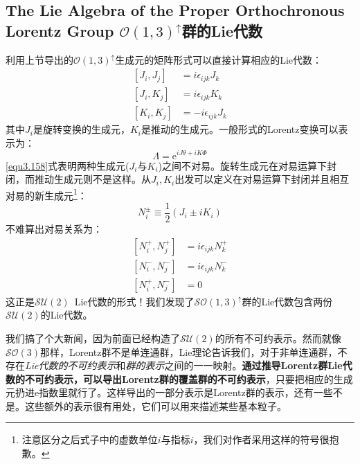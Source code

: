 \subsection[$\mathcal{O}(1, 3)^\uparrow$群的Lie代数]{The Lie Algebra of the Proper Orthochronous Lorentz Group \quad $\mathcal{O}(1, 3)^\uparrow$群的Lie代数}
\label{equ3.7.3}
利用上节导出的$\mathcal{O}(1, 3)^\uparrow$生成元的矩阵形式可以直接计算相应的Lie代数：
\begin{align}
\label{equ3.157}
	[J_i, J_j] &= i \epsilon_{ijk} J_k \\
\label{equ3.158}
	[J_i, K_j] &= i \epsilon_{ijk} K_k \\
\label{equ3.159}
	[K_i, K_j] &= -i \epsilon_{ijk} J_k
\end{align}
其中$J_i$是旋转变换的生成元，$K_i$是推动的生成元。一般形式的Lorentz变换可以表示为：
\begin{equation}
\label{equ3.160}
	\Lambda = \mathrm{e}^{i J \theta + i K \Phi}
\end{equation}
\ref{equ3.158}式表明两种生成元($J_i$与$K_i$)之间不对易。旋转生成元在对易运算下封闭，而推动生成元则不是这样。从$J_i, K_i$出发可以定义在对易运算下封闭并且相互对易的新生成元\footnote{注意区分之后式子中的虚数单位$i$与指标$i$，我们对作者采用这样的符号很抱歉。}：
\begin{equation}
\label{equ3.161}
	N_i^\pm \equiv \frac{1}{2} (J_i \pm i K_i)
\end{equation}
不难算出对易关系为：
\begin{align}
\label{equ3.162}
	[N_i^+, N_j^+] &= i \epsilon_{ijk} N_k^+ \\
\label{equ3.163}
	[N_i^-, N_j^-] &= i \epsilon_{ijk} N_k^- \\
\label{equ3.164}
	[N_i^+, N_j^-] &= 0
\end{align}
这正是$\mathcal{SU}(2)$\, Lie代数的形式！我们发现了$\mathcal{SO}(1, 3)^\uparrow$群的Lie代数包含两份$\mathcal{SU}(2)$的Lie代数。

我们搞了个大新闻，因为前面已经构造了$\mathcal{SU}(2)$的所有不可约表示。然而就像$\mathcal{SO}(3)$那样，Lorentz群不是单连通群，Lie理论告诉我们，对于非单连通群，不存在{\it Lie代数的不可约表示}和{\it 群的表示}之间的一一映射。{\bf 通过推导Lorentz群Lie代数的不可约表示，可以导出Lorentz群的覆盖群的不可约表示}，只要把相应的生成元扔进$\mathrm{e}$指数里就行了。这样导出的一部分表示是Lorentz群的表示，还有一些不是。这些额外的表示很有用处，它们可以用来描述某些基本粒子。

